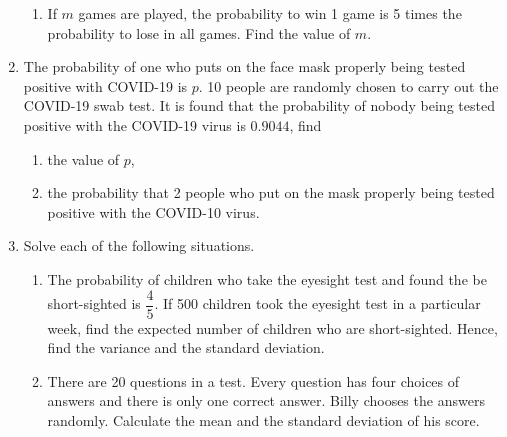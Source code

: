 \documentclass{report}
\begin{document}
\begin{multicols*}{2}
\begin{enumerate}
\begin{enumerate}
                  \item If $m$ games are played, the probability to win 1 game is 5 times the
                        probability to lose in all games. Find the value of $m$.
              \end{enumerate}

        \item The probability of one who puts on the face mask properly being tested positive
              with COVID-19 is $p$. 10 people are randomly chosen to carry out the COVID-19
              swab test. It is found that the probability of nobody being tested positive
              with the COVID-19 virus is $0.9044$, find
              \begin{enumerate}
                  \item the value of $p$,
                  \item the probability that 2 people who put on the mask properly being tested
                        positive with the COVID-10 virus.
              \end{enumerate}

        \item Solve each of the following situations.
              \begin{enumerate}
                  \item The probability of children who take the eyesight test and found the be
                        short-sighted is $\dfrac{4}{5}$. If 500 children took the eyesight test in a
                        particular week, find the expected number of children who are short-sighted.
                        Hence, find the variance and the standard deviation.

                  \item There are 20 questions in a test. Every question has four choices of answers
                        and there is only one correct answer. Billy chooses the answers randomly.
                        Calculate the mean and the standard deviation of his score.
              \end{enumerate}
    \end{enumerate}

\end{multicols*}
\end{document}
